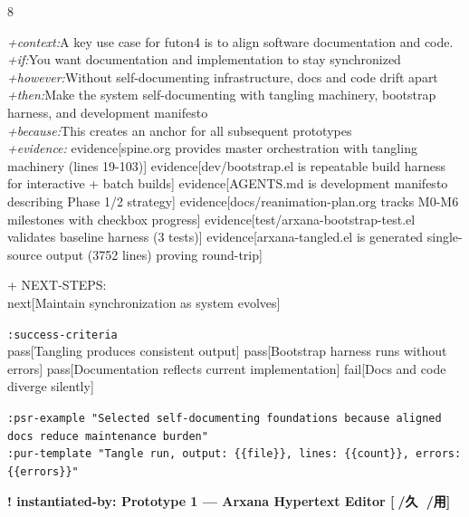 \documentclass[landscape]{article}
\newcommand{\flexitag}[1]{\textcolor[gray]{0.35}{\textit{#1}}}
\newenvironment{devmapsettled}{%
  \def\FrameCommand{\colorbox{devmapsettledbg}}%
  \setlength{\fboxsep}{2pt}%
  \MakeFramed{\advance\hsize-\width \FrameRestore}%
}{\endMakeFramed}
\begin{document}
\begin{paracol}{8}
\begin{devmapsettled}
  \flexitag{+context:}A key use case for futon4 is to align software documentation and code.\\
  \flexitag{+if:}You want documentation and implementation to stay synchronized\\
  \flexitag{+however:}Without self-documenting infrastructure, docs and code drift apart\\
  \flexitag{+then:}Make the system self-documenting with tangling machinery, bootstrap harness, and development manifesto\\
  \flexitag{+because:}This creates an anchor for all subsequent prototypes\\
  \flexitag{+evidence:} evidence[spine.org provides master orchestration with tangling machinery (lines 19-103)] evidence[dev/bootstrap.el is repeatable build harness for interactive + batch builds] evidence[AGENTS.md is development manifesto describing Phase 1/2 strategy] evidence[docs/reanimation-plan.org tracks M0-M6 milestones with checkbox progress] evidence[test/arxana-bootstrap-test.el validates baseline harness (3 tests)] evidence[arxana-tangled.el is generated single-source output (3752 lines) proving round-trip]\\
\par
  + NEXT-STEPS:\\
    next[Maintain synchronization as system evolves]\\
\par
  \texttt{:\allowbreak{}success-\allowbreak{}criteria}\\
    pass[Tangling produces consistent output] pass[Bootstrap harness runs without errors] pass[Documentation reflects current implementation] fail[Docs and code diverge silently]\\
\par
  \texttt{:\allowbreak{}psr-\allowbreak{}example "Selected self-\allowbreak{}documenting foundations because aligned docs reduce maintenance burden"}\\
  \texttt{:\allowbreak{}pur-\allowbreak{}template "Tangle run,\allowbreak{} output:\allowbreak{} \{\{file\}\},\allowbreak{} lines:\allowbreak{} \{\{count\}\},\allowbreak{} errors:\allowbreak{} \{\{errors\}\}"}\\
\par
\par
\end{devmapsettled}
\begin{devmapsettled}
\textbf{! instantiated-by: Prototype 1 — Arxana Hypertext Editor [🙅/久 💖/用]}\\

\end{devmapsettled}
\end{paracol}
\end{document}
